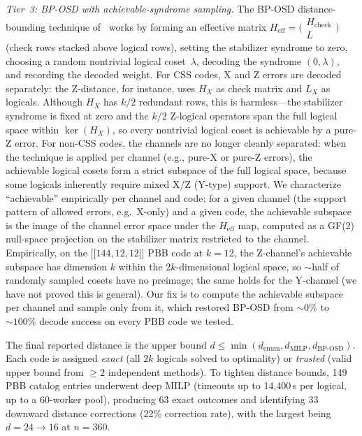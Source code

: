 \documentclass[aps,prxquantum,twocolumn,superscriptaddress,nofootinbib]{revtex4-2}
\newcommand{\dblbrk}[1]{\ensuremath{\lbrack\!\lbrack #1 \rbrack\!\rbrack}}
\newcommand{\code}[1]{\dblbrk{#1}}
\begin{document}
\emph{Tier~3: BP-OSD with achievable-syndrome sampling.}
The BP-OSD distance-bounding technique of~\cite{bravyi2024high} works by forming an effective matrix $H_{\mathrm{eff}} = \bigl(\begin{smallmatrix} H_{\mathrm{check}} \\ L \end{smallmatrix}\bigr)$ (check rows stacked above logical rows), setting the stabilizer syndrome to zero, choosing a random nontrivial logical coset~$\lambda$, decoding the syndrome $(0, \lambda)$, and recording the decoded weight.
For CSS codes, X and Z errors are decoded separately: the Z-distance, for instance, uses $H_X$ as check matrix and $L_X$ as logicals.
Although $H_X$ has $k/2$ redundant rows, this is harmless---the stabilizer syndrome is fixed at zero and the $k/2$ Z-logical operators span the full logical space within $\ker(H_X)$, so every nontrivial logical coset is achievable by a pure-Z error.
For non-CSS codes, the channels are no longer cleanly separated: when the technique is applied per channel (e.g., pure-X or pure-Z errors), the achievable logical cosets form a strict subspace of the full logical space, because some logicals inherently require mixed X/Z (Y-type) support.
We characterize ``achievable'' empirically per channel and code: for a given channel (the support pattern of allowed errors, e.g.\ X-only) and a given code, the achievable subspace is the image of the channel error space under the $H_{\mathrm{eff}}$ map, computed as a GF(2) null-space projection on the stabilizer matrix restricted to the channel.
Empirically, on the $\code{144,12,12}$ PBB code at $k = 12$, the Z-channel's achievable subspace has dimension $k$ within the $2k$-dimensional logical space, so $\sim$half of randomly sampled cosets have no preimage; the same holds for the Y-channel (we have not proved this is general).
Our fix is to compute the achievable subspace per channel and sample only from it, which restored BP-OSD from $\sim 0\%$ to $\sim 100\%$ decode success on every PBB code we tested.

The final reported distance is the upper bound $d \leq \min(d_{\text{enum}}, d_{\text{MILP}}, d_{\text{BP-OSD}})$.
Each code is assigned \emph{exact} (all $2k$ logicals solved to optimality) or \emph{trusted} (valid upper bound from $\geq 2$ independent methods).
To tighten distance bounds, 149 PBB catalog entries underwent deep MILP (timeouts up to 14{,}400\,s per logical, up to a 60-worker pool), producing 63 exact outcomes and identifying 33 downward distance corrections (22\% correction rate), with the largest being $d = 24 \to 16$ at $n = 360$.
\end{document}
